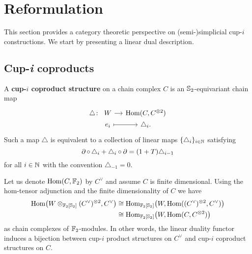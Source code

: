 
\section{Reformulation}\label{s:reformulation}

This section provides a category theoretic perspective on \mbox{(semi-)}simplicial \mbox{cup-$i$} constructions.
We start by presenting a linear dual description.

\subsection{Cup-\textit{i} coproducts}

A \textbf{cup-$i$ coproduct structure} on a chain complex $C$ is an $\mathbb{S}_2$-equivariant chain map
\[
\begin{tikzcd}[column sep=small,row sep=0]
	\triangle \colon &[-15pt] W \rar & \Hom(C, C^{\ot 2}) \\
	& e_i \rar[maps to] & \triangle_i.
\end{tikzcd}
\]
Such a map $\triangle$ is equivalent to a collection of linear maps $\{\triangle_i\}_{i\in\mathbb{N}}$ satisfying
\[
\operatorname{\partial} \circ \, \triangle_i + \triangle_i \circ \operatorname{\partial} =
(1+T) \triangle_{i-1}
\]
for all $i \in \mathbb{N}$ with the convention $\triangle_{-1} = 0$.

Let us denote $\mathrm{Hom}(C, {\mathbb{F}_2})$ by $C^\vee$ and assume $C$ is finite dimensional.
Using the hom-tensor adjunction and the finite dimensionality of $C$ we have
\begin{equation}\label{eq:hom-tensor}
	\begin{split}
		\mathrm{Hom} \big(W \otimes_{{\mathbb{F}_2}[\mathbb{S}_2]} (C^\vee)^{\otimes 2}, C^\vee \big) & \cong
		\mathrm{Hom}_{{\mathbb{F}_2}[\mathbb{S}_2]} \big( W, \mathrm{Hom}((C^\vee)^{\otimes 2}, C^\vee) \big) \\ & \cong
		\mathrm{Hom}_{{\mathbb{F}_2}[\mathbb{S}_2]} \big( W, \mathrm{Hom}(C, C^{\otimes 2}) \big)
	\end{split}
\end{equation}
as chain complexes of ${\mathbb{F}_2}$-modules.
In other words, the linear duality functor induces a bijection between \mbox{cup-$i$} product structures on $C^\vee$ and cup-$i$ coproduct structures on $C$.

%

